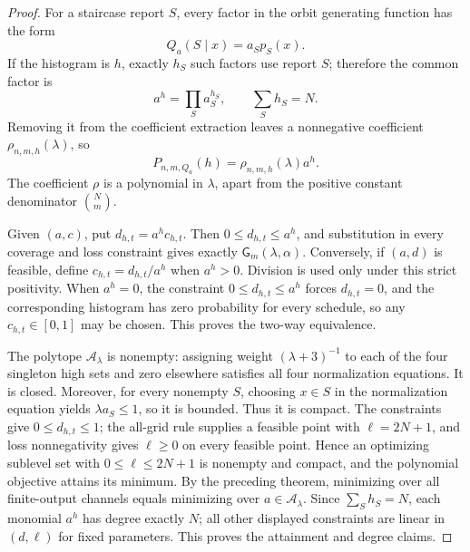 \documentclass{article}
\begin{document}
\begin{proof}
For a staircase report \(S\), every factor in the orbit generating function has the form
\[
 Q_a(S\mid x)=a_Sp_S(x).
\]
If the histogram is \(h\), exactly \(h_S\) such factors use report \(S\); therefore the common factor is
\[
 a^h=\prod_Sa_S^{h_S},\qquad \sum_Sh_S=N.
\]
Removing it from the coefficient extraction leaves a nonnegative coefficient \(\rho_{n,m,h}(\lambda)\), so
\[
 P_{n,m,Q_a}(h)=\rho_{n,m,h}(\lambda)a^h.
\]
The coefficient \(\rho\) is a polynomial in \(\lambda\), apart from the positive constant denominator \(\binom Nm\).

Given \((a,c)\), put \(d_{h,t}=a^hc_{h,t}\).  Then \(0\le d_{h,t}\le a^h\), and substitution in every coverage and loss constraint gives exactly \(\mathsf G_m(\lambda,\alpha)\).  Conversely, if \((a,d)\) is feasible, define \(c_{h,t}=d_{h,t}/a^h\) when \(a^h>0\).  Division is used only under this strict positivity.  When \(a^h=0\), the constraint \(0\le d_{h,t}\le a^h\) forces \(d_{h,t}=0\), and the corresponding histogram has zero probability for every schedule, so any \(c_{h,t}\in[0,1]\) may be chosen.  This proves the two-way equivalence.

The polytope \(\mathcal A_\lambda\) is nonempty: assigning weight \((\lambda+3)^{-1}\) to each of the four singleton high sets and zero elsewhere satisfies all four normalization equations.  It is closed.  Moreover, for every nonempty \(S\), choosing \(x\in S\) in the normalization equation yields \(\lambda a_S\le1\), so it is bounded.  Thus it is compact.  The constraints give \(0\le d_{h,t}\le1\); the all-grid rule supplies a feasible point with \(\ell=2N+1\), and loss nonnegativity gives \(\ell\ge0\) on every feasible point.  Hence an optimizing sublevel set with \(0\le\ell\le2N+1\) is nonempty and compact, and the polynomial objective attains its minimum.  By the preceding theorem, minimizing over all finite-output channels equals minimizing over \(a\in\mathcal A_\lambda\).  Since \(\sum_Sh_S=N\), each monomial \(a^h\) has degree exactly \(N\); all other displayed constraints are linear in \((d,\ell)\) for fixed parameters.  This proves the attainment and degree claims.


\end{proof}
\end{document}

